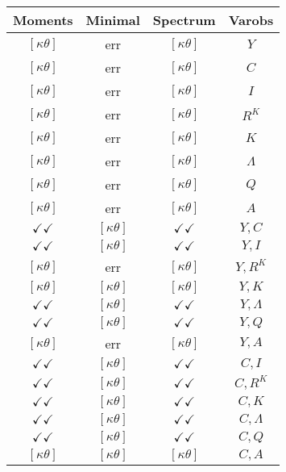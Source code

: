 \documentclass[a4paper,10pt]{article}
\begin{document}
\centering
\begin{longtable}{|c|c|c|c|}
\hline
Moments & Minimal & Spectrum & Varobs \\
\hline
$[\kappa \theta ]$ & err & $[\kappa \theta ]$ & ${Y}$ \\
\hline
$[\kappa \theta ]$ & err & $[\kappa \theta ]$ & ${C}$ \\
\hline
$[\kappa \theta ]$ & err & $[\kappa \theta ]$ & ${I}$ \\
\hline
$[\kappa \theta ]$ & err & $[\kappa \theta ]$ & ${R^{K}}$ \\
\hline
$[\kappa \theta ]$ & err & $[\kappa \theta ]$ & ${K}$ \\
\hline
$[\kappa \theta ]$ & err & $[\kappa \theta ]$ & ${\Lambda}$ \\
\hline
$[\kappa \theta ]$ & err & $[\kappa \theta ]$ & ${Q}$ \\
\hline
$[\kappa \theta ]$ & err & $[\kappa \theta ]$ & ${A}$ \\
\hline
$\checkmark\checkmark$ & $[\kappa \theta ]$ & $\checkmark\checkmark$ & ${Y},{C}$ \\
\hline
$\checkmark\checkmark$ & $[\kappa \theta ]$ & $\checkmark\checkmark$ & ${Y},{I}$ \\
\hline
$[\kappa \theta ]$ & err & $[\kappa \theta ]$ & ${Y},{R^{K}}$ \\
\hline
$[\kappa \theta ]$ & $[\kappa \theta ]$ & $[\kappa \theta ]$ & ${Y},{K}$ \\
\hline
$\checkmark\checkmark$ & $[\kappa \theta ]$ & $\checkmark\checkmark$ & ${Y},{\Lambda}$ \\
\hline
$\checkmark\checkmark$ & $[\kappa \theta ]$ & $\checkmark\checkmark$ & ${Y},{Q}$ \\
\hline
$[\kappa \theta ]$ & err & $[\kappa \theta ]$ & ${Y},{A}$ \\
\hline
$\checkmark\checkmark$ & $[\kappa \theta ]$ & $\checkmark\checkmark$ & ${C},{I}$ \\
\hline
$\checkmark\checkmark$ & $[\kappa \theta ]$ & $\checkmark\checkmark$ & ${C},{R^{K}}$ \\
\hline
$\checkmark\checkmark$ & $[\kappa \theta ]$ & $\checkmark\checkmark$ & ${C},{K}$ \\
\hline
$\checkmark\checkmark$ & $[\kappa \theta ]$ & $\checkmark\checkmark$ & ${C},{\Lambda}$ \\
\hline
$\checkmark\checkmark$ & $[\kappa \theta ]$ & $\checkmark\checkmark$ & ${C},{Q}$ \\
\hline
$[\kappa \theta ]$ & $[\kappa \theta ]$ & $[\kappa \theta ]$ & ${C},{A}$ \\

\end{longtable}
\end{document}
